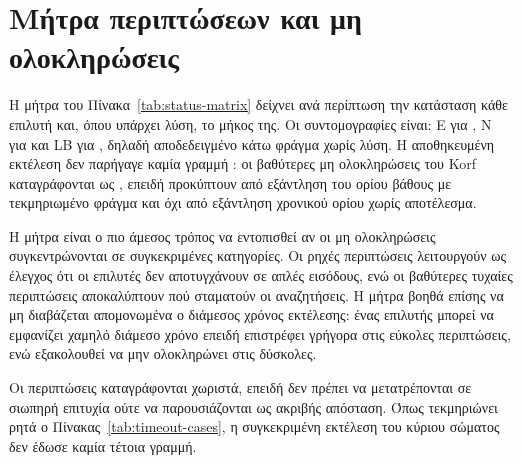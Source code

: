 \begin{table}[htbp]\centering

\caption[Κόμβοι αναζήτησης ανά επιλυτή]{Διάμεσοι κόμβοι επέκτασης και παραγωγής ανά επιλυτή· η κενή τιμή του προσαρμογέα σημαίνει μη διαθέσιμη μέτρηση. Πηγή: .}
\label{tab:solver-nodes}
\end{table}

\section{Μήτρα περιπτώσεων και μη ολοκληρώσεις}
\label{sec:experiments-matrix}

Η μήτρα του Πίνακα~\ref{tab:status-matrix} δείχνει ανά περίπτωση την κατάσταση κάθε επιλυτή και, όπου υπάρχει λύση, το μήκος της. Οι συντομογραφίες είναι: E για , N για  και LB για , δηλαδή αποδεδειγμένο κάτω φράγμα χωρίς λύση. Η αποθηκευμένη εκτέλεση δεν παρήγαγε καμία γραμμή : οι βαθύτερες μη ολοκληρώσεις του Korf καταγράφονται ως , επειδή προκύπτουν από εξάντληση του ορίου βάθους με τεκμηριωμένο φράγμα και όχι από εξάντληση χρονικού ορίου χωρίς αποτέλεσμα.

Η μήτρα είναι ο πιο άμεσος τρόπος να εντοπισθεί αν οι μη ολοκληρώσεις συγκεντρώνονται σε συγκεκριμένες κατηγορίες. Οι ρηχές περιπτώσεις λειτουργούν ως έλεγχος ότι οι επιλυτές δεν αποτυγχάνουν σε απλές εισόδους, ενώ οι βαθύτερες τυχαίες περιπτώσεις αποκαλύπτουν πού σταματούν οι αναζητήσεις. Η μήτρα βοηθά επίσης να μη διαβάζεται απομονωμένα ο διάμεσος χρόνος εκτέλεσης: ένας επιλυτής μπορεί να εμφανίζει χαμηλό διάμεσο χρόνο επειδή επιστρέφει γρήγορα στις εύκολες περιπτώσεις, ενώ εξακολουθεί να μην ολοκληρώνει στις δύσκολες.

\begin{table}[htbp]\centering

\caption[Μήτρα κατάστασης ανά περίπτωση και επιλυτή]{Μήτρα κατάστασης ανά περίπτωση και επιλυτή στο κύριο σώμα μετρήσεων (E~= , N~= , LB~= )· όπου υπάρχει λύση αναγράφεται και το μήκος της. Πηγή: .}
\label{tab:status-matrix}
\end{table}

Οι περιπτώσεις  καταγράφονται χωριστά, επειδή δεν πρέπει να μετατρέπονται σε σιωπηρή επιτυχία ούτε να παρουσιάζονται ως ακριβής απόσταση. Όπως τεκμηριώνει ρητά ο Πίνακας~\ref{tab:timeout-cases}, η συγκεκριμένη εκτέλεση του κύριου σώματος δεν έδωσε καμία τέτοια γραμμή.

